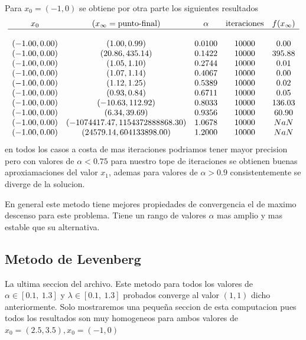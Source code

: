 \documentclass[letterpaper]{article}
\begin{document}
Para \(x_0 = (-1,0)\) se obtiene por otra parte los siguientes resultados
\[
\begin{array}{c c c c c}
  x_0 & (x_{\infty} = \text{punto-final}) & \alpha & \text{iteraciones} &
    f(x_{\infty}) \\
  \hline \\
(-1.00, 0.00) & (1.00, 0.99)                    & 0.0100 & 10000 & 0.00   \\
(-1.00, 0.00) & (20.86, 435.14)                 & 0.1422 & 10000 & 395.88 \\
(-1.00, 0.00) & (1.05, 1.10)                    & 0.2744 & 10000 & 0.01   \\
(-1.00, 0.00) & (1.07, 1.14)                    & 0.4067 & 10000 & 0.00   \\
(-1.00, 0.00) & (1.12, 1.25)                    & 0.5389 & 10000 & 0.02   \\
(-1.00, 0.00) & (0.93, 0.84)                    & 0.6711 & 10000 & 0.05   \\
(-1.00, 0.00) & (-10.63, 112.92)                & 0.8033 & 10000 & 136.03 \\
(-1.00, 0.00) & (6.34, 39.69)                   & 0.9356 & 10000 & 60.90  \\
(-1.00, 0.00) & (-1074417.47, 1154372888868.30) & 1.0678 & 10000 & NaN \\
(-1.00, 0.00) & (24579.14, 604133898.00)        & 1.2000 & 10000 & NaN
\end{array}
\]
en todos los casos a costa de mas iteraciones podriamos tener mayor
precision pero con valores de \(\alpha < 0.75\) para nuestro tope de
iteraciones se obtienen buenas aproxiamaciones del valor \(x_1\), ademas
para valores de \(\alpha > 0.9\) consistentemente se diverge de la solucion.

En general este metodo tiene mejores propiedades de convergencia el de
maximo descenso para este problema. Tiene un rango de valores \(\alpha\)
mas amplio y mas estable que su alternativa.

\subsection*{Metodo de Levenberg}
La ultima seccion del archivo. Este metodo para todos los valores de
\(\alpha \in [0.1,\ 1.3]\) y \(\lambda \in [0.1,\ 1.3]\) probados
converge al valor \((1,1)\) dicho anteriormente. Solo mostraremos una
pequeña seccion de esta computacion pues todos los resultados son muy
homogeneos para ambos valores de \(x_0 = (2.5, 3.5), x_0 = (-1,0)\)
\end{document}
